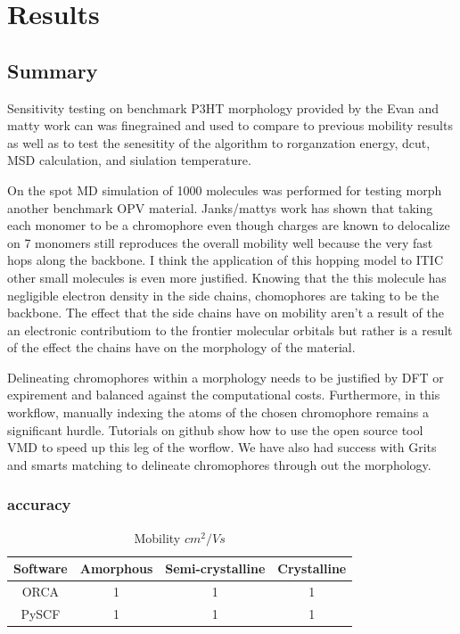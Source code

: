 \chapter{Results}
\label{chap:results}

\section{Summary}
Sensitivity testing on benchmark P3HT morphology provided by the Evan and matty work can was finegrained and
used to compare to previous mobility results as well as to test the senesitity of the algorithm to
rorganzation energy, dcut, MSD calculation, and siulation temperature.

On the spot MD simulation of 1000
molecules was performed for testing morph another benchmark OPV material. Janks/mattys work has shown that taking
each monomer to be a chromophore even though charges are known to delocalize on 7 monomers still reproduces
the overall mobility well because the very fast hops along the backbone. I think the application of this
hopping model to ITIC other small molecules is even more justified. Knowing that the this molecule has
negligible electron density in the side chains, chomophores are taking to be the backbone. The effect that
the side chains have on mobility aren't a result of the an electronic contributiom to the frontier molecular
orbitals but rather is a result of the effect the chains have on the morphology of the material. 

Delineating chromophores within a morphology needs to be justified by DFT or expirement and balanced against
the computational costs. Furthermore, in this workflow, manually indexing the atoms of the chosen chromophore
remains a significant hurdle. Tutorials on github show how to use the open source tool VMD to speed up this
leg of the worflow. We have also had success with Grits and smarts matching to delineate chromophores through
out the morphology. 

\subsection{accuracy}

\begin{table}[ht]
    \caption{Mobility $cm^{2}/Vs$} %
\centering %
\begin{tabular}{c c c c} %
\hline\hline %
Software & Amorphous & Semi-crystalline & Crystalline \\ [0.5ex] %
\hline %
ORCA & 1 & 1 & 1 \\ %
PySCF & 1 & 1 & 1 \\ [1ex] %
\hline %
\end{tabular}
\label{table:nonlin} %
\end{table}

